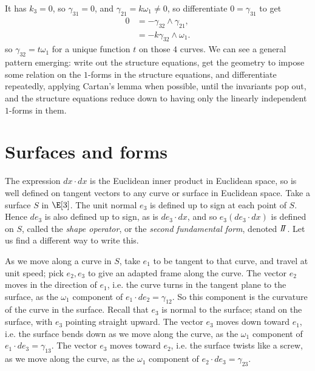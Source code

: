 It has \(k_3=0\), so \(\gamma_{31}=0\), and \(\gamma_{21}=k \omega_1 \ne 0\), so differentiate \(0=\gamma_{31}\) to get 
\begin{align*}
0&=
-\gamma_{32}\wedge\gamma_{21},
\\
&=
-k\gamma_{32}\wedge\omega_1.
\end{align*}
so \(\gamma_{32}=t\omega_1\) for a unique function \(t\) on those \(4\) curves.
We can see a general pattern emerging: write out the structure equations, get the geometry to impose some relation on the \(1\)-forms in the structure equations, and differentiate repeatedly, applying Cartan's lemma when possible, until the invariants pop out, and the structure equations reduce down to having only the linearly independent \(1\)-forms in them.

\section{Surfaces and forms}
The expression \(dx \cdot dx\) is the Euclidean inner product in Euclidean space, so is well defined on tangent vectors to any curve or surface in Euclidean space.
Take a surface \(S\) in \(\E[3]\).
The unit normal \(e_3\) is defined up to sign at each point of \(S\).
Hence \(de_3\) is also defined up to sign, as is \(de_3 \cdot dx\), and so \(e_3 (de_3 \cdot dx)\) is defined on \(S\), called the \emph{shape operator}, or the \emph{second fundamental form}, denoted \(\shapeOp\).
Let us find a different way to write this.

As we move along  a curve in \(S\), take \(e_1\) to be tangent to that curve, and travel at unit speed; pick \(e_2,e_3\) to give an adapted frame along the curve.
The vector \(e_2\) moves in the direction of \(e_1\), i.e. the curve turns in the tangent plane to the surface, as the \(\omega_1\) component of \(e_1 \cdot de_2=\gamma_{12}\).
So this component is the curvature of the curve in the surface.
Recall that \(e_3\) is normal to the surface; stand on the surface, with \(e_3\) pointing straight upward.
The vector \(e_3\) moves down toward \(e_1\), i.e. the surface bends down as we move along the curve, as the \(\omega_1\) component of \(e_1 \cdot de_3=\gamma_{13}\).
The vector \(e_3\) moves toward \(e_2\), i.e. the surface twists like a screw, as we move along the curve, as the \(\omega_1\) component of \(e_2 \cdot de_3=\gamma_{23}\).

